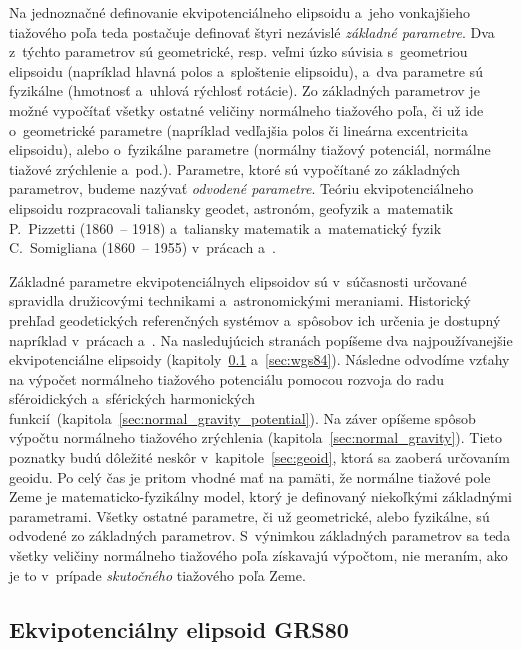 \documentclass[a4paper, 12pt]{book}
\begin{document}
Na jednoznačné definovanie ekvipotenciálneho elipsoidu a~jeho vonkajšieho 
tiažového poľa teda postačuje definovať štyri nezávislé \emph{základné 
parametre}.  Dva z~týchto parametrov sú geometrické, resp. veľmi úzko súvisia 
s~geometriou elipsoidu (napríklad hlavná polos a~sploštenie elipsoidu), a~dva 
parametre sú fyzikálne (hmotnosť a~uhlová rýchlosť rotácie).  Zo základných 
parametrov je možné vypočítať všetky ostatné veličiny normálneho tiažového 
poľa, či už ide o~geometrické parametre (napríklad vedľajšia polos či lineárna 
excentricita elipsoidu), alebo o~fyzikálne parametre (normálny tiažový 
potenciál, normálne tiažové zrýchlenie a~pod.).  Parametre, ktoré sú vypočítané 
zo základných parametrov, budeme nazývať \emph{odvodené parametre}.  Teóriu 
ekvipotenciálneho elipsoidu rozpracovali taliansky geodet, astronóm, geofyzik 
a~matematik P.~Pizzetti (1860~-- 1918) a~taliansky matematik a~matematický 
fyzik C.~Somigliana (1860~-- 1955) v~prácach \textcite{Pizzetti1984} 
a~\textcite{Somigliana1929}.

Základné parametre ekvipotenciálnych elipsoidov sú v~súčasnosti určované 
spravidla družicovými technikami a~astronomickými meraniami.  Historický 
prehľad geodetických referenčných systémov a~spôsobov ich určenia je dostupný 
napríklad v~prácach \textcite{TorgeGeodesy} a~\textcite{MoritzPhysicalGeodesy}.  
Na nasledujúcich stranách popíšeme dva najpoužívanejšie ekvipotenciálne 
elipsoidy (kapitoly~\ref{sec:grs80} a~\ref{sec:wgs84}).  Následne odvodíme 
vzťahy na výpočet normálneho tiažového potenciálu pomocou rozvoja do radu 
sféroidických a~sférických harmonických 
funkcií~(kapitola~\ref{sec:normal_gravity_potential}).  Na záver opíšeme spôsob 
výpočtu normálneho tiažového zrýchlenia (kapitola~\ref{sec:normal_gravity}).  
Tieto poznatky budú dôležité neskôr v~kapitole~\ref{sec:geoid}, ktorá sa 
zaoberá určovaním geoidu.  Po celý čas je pritom vhodné mať na pamäti, že 
normálne tiažové pole Zeme je matematicko-fyzikálny model, ktorý je definovaný 
niekoľkými základnými parametrami.  Všetky ostatné parametre, či už 
geometrické, alebo fyzikálne, sú odvodené zo základných parametrov.  S~výnimkou 
základných parametrov sa teda všetky veličiny normálneho tiažového poľa 
získavajú výpočtom, nie meraním, ako je to v~prípade \emph{skutočného} 
tiažového poľa Zeme.





\newpage
\subsection{Ekvipotenciálny elipsoid GRS80}
\label{sec:grs80}
\end{document}
